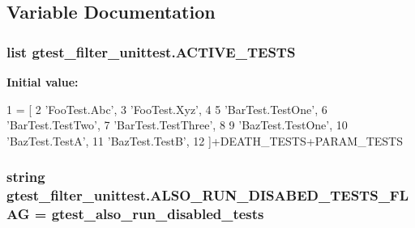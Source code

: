 \subsection{Variable Documentation}
\subsubsection[{\texorpdfstring{A\+C\+T\+I\+V\+E\+\_\+\+T\+E\+S\+TS}{ACTIVE_TESTS}}]{\setlength{\rightskip}{0pt plus 5cm}list gtest\+\_\+filter\+\_\+unittest.\+A\+C\+T\+I\+V\+E\+\_\+\+T\+E\+S\+TS}\hypertarget{namespacegtest__filter__unittest_a8eb26cb0e0ac81737723cc9d16e1d253}{}\label{namespacegtest__filter__unittest_a8eb26cb0e0ac81737723cc9d16e1d253}
{\bfseries Initial value\+:}
\begin{DoxyCode}
1 = [
2     \textcolor{stringliteral}{'FooTest.Abc'},
3     \textcolor{stringliteral}{'FooTest.Xyz'},
4 
5     \textcolor{stringliteral}{'BarTest.TestOne'},
6     \textcolor{stringliteral}{'BarTest.TestTwo'},
7     \textcolor{stringliteral}{'BarTest.TestThree'},
8 
9     \textcolor{stringliteral}{'BazTest.TestOne'},
10     \textcolor{stringliteral}{'BazTest.TestA'},
11     \textcolor{stringliteral}{'BazTest.TestB'},
12     ]+DEATH\_TESTS+PARAM\_TESTS
\end{DoxyCode}
\subsubsection[{\texorpdfstring{A\+L\+S\+O\+\_\+\+R\+U\+N\+\_\+\+D\+I\+S\+A\+B\+E\+D\+\_\+\+T\+E\+S\+T\+S\+\_\+\+F\+L\+AG}{ALSO_RUN_DISABED_TESTS_FLAG}}]{\setlength{\rightskip}{0pt plus 5cm}string gtest\+\_\+filter\+\_\+unittest.\+A\+L\+S\+O\+\_\+\+R\+U\+N\+\_\+\+D\+I\+S\+A\+B\+E\+D\+\_\+\+T\+E\+S\+T\+S\+\_\+\+F\+L\+AG = \textquotesingle{}gtest\+\_\+also\+\_\+run\+\_\+disabled\+\_\+tests\textquotesingle{}}\hypertarget{namespacegtest__filter__unittest_aa2da713fbaa08fdbaa7cd78c45974edf}{}\label{namespacegtest__filter__unittest_aa2da713fbaa08fdbaa7cd78c45974edf}
